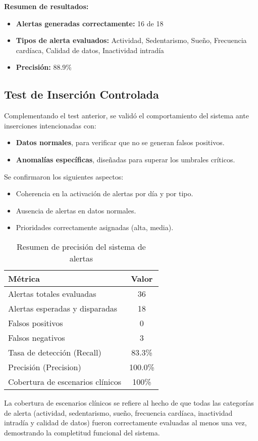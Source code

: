 \vspace{1em}
\noindent\textbf{Resumen de resultados:}
\begin{itemize}
    \item \textbf{Alertas generadas correctamente:} 16 de 18
    \item \textbf{Tipos de alerta evaluados:} Actividad, Sedentarismo, Sueño, Frecuencia cardíaca, Calidad de datos, Inactividad intradía
    \item \textbf{Precisión:} 88.9\%
\end{itemize}

\subsection{Test de Inserción Controlada}
\label{subsec:test_insertions}

Complementando el test anterior, se validó el comportamiento del sistema ante inserciones intencionadas con:
\begin{itemize}
    \item \textbf{Datos normales}, para verificar que no se generan falsos positivos.
    \item \textbf{Anomalías específicas}, diseñadas para superar los umbrales críticos.
\end{itemize}

Se confirmaron los siguientes aspectos:
\begin{itemize}
    \item Coherencia en la activación de alertas por día y por tipo.
    \item Ausencia de alertas en datos normales.
    \item Prioridades correctamente asignadas (alta, media).
\end{itemize}

\begin{table}[H]
\centering
\caption{Resumen de precisión del sistema de alertas}
\begin{tabular}{|l|c|}
\hline
\textbf{Métrica} & \textbf{Valor} \\ \hline
Alertas totales evaluadas & 36 \\
Alertas esperadas y disparadas & 18 \\
Falsos positivos & 0 \\
Falsos negativos & 3 \\
Tasa de detección (Recall) & 83.3\% \\
Precisión (Precision) & 100.0\% \\
Cobertura de escenarios clínicos & 100\% \\ \hline
\end{tabular}
\label{tab:resumen_alertas}
\end{table}
La cobertura de escenarios clínicos se refiere al hecho de que todas las categorías de alerta (actividad, sedentarismo, sueño, frecuencia cardíaca, inactividad intradía y calidad de datos) fueron correctamente evaluadas al menos una vez, demostrando la completitud funcional del sistema.

